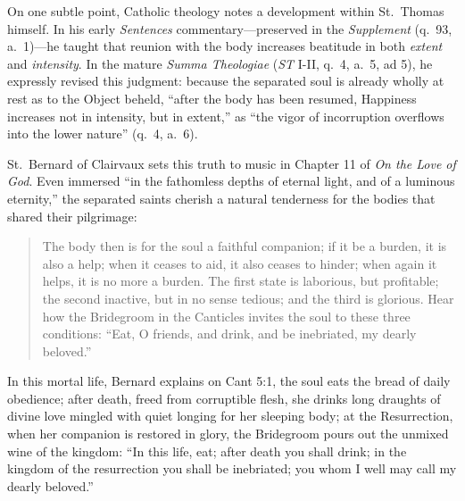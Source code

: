 On one subtle point, Catholic theology notes a development within St.\ Thomas himself. In his early \textit{Sentences} commentary---preserved in the \textit{Supplement} (q.\ 93, a.\ 1)---he taught that reunion with the body increases beatitude in both \textit{extent} and \textit{intensity}. In the mature \textit{Summa Theologiae} (\textit{ST} I-II, q.\ 4, a.\ 5, ad 5), he expressly revised this judgment: because the separated soul is already wholly at rest as to the Object beheld, ``after the body has been resumed, Happiness increases not in intensity, but in extent,'' as ``the vigor of incorruption overflows into the lower nature'' (q.\ 4, a.\ 6).

St.\ Bernard of Clairvaux sets this truth to music in Chapter 11 of \textit{On the Love of God}. Even immersed ``in the fathomless depths of eternal light, and of a luminous eternity,'' the separated saints cherish a natural tenderness for the bodies that shared their pilgrimage:

\begin{quote}
The body then is for the soul a faithful companion; if it be a burden, it is also a help; when it ceases to aid, it also ceases to hinder; when again it helps, it is no more a burden. The first state is laborious, but profitable; the second inactive, but in no sense tedious; and the third is glorious. Hear how the Bridegroom in the Canticles invites the soul to these three conditions: ``Eat, O friends, and drink, and be inebriated, my dearly beloved.''
\end{quote}

In this mortal life, Bernard explains on Cant 5:1, the soul eats the bread of daily obedience; after death, freed from corruptible flesh, she drinks long draughts of divine love mingled with quiet longing for her sleeping body; at the Resurrection, when her companion is restored in glory, the Bridegroom pours out the unmixed wine of the kingdom: ``In this life, eat; after death you shall drink; in the kingdom of the resurrection you shall be inebriated; you whom I well may call my dearly beloved.''
